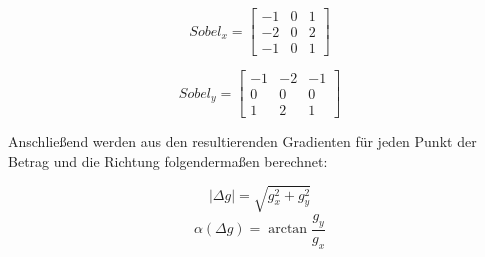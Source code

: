 \documentclass[12pt]{article}
\begin{document}
\begin{equation*}
  Sobel_x =
  \begin{bmatrix}
    -1 & 0 & 1 \\
    -2 & 0 & 2 \\
    -1 & 0 & 1
  \end{bmatrix}
\end{equation*}
  
\begin{equation*}
  Sobel_y =
  \begin{bmatrix}
    -1 & -2 & -1 \\
     0 &  0 &  0 \\
     1 &  2 &  1
  \end{bmatrix}
\end{equation*}

Anschließend werden aus den resultierenden Gradienten für jeden Punkt der Betrag und die Richtung folgendermaßen berechnet:

\begin{equation*}
  |\Delta g| = \sqrt{g_x^2 + g_y^2}
\end{equation*}
\begin{equation*}
  \alpha(\Delta g) = \arctan{\frac{g_y}{g_x}}
\end{equation*}
\end{document}
